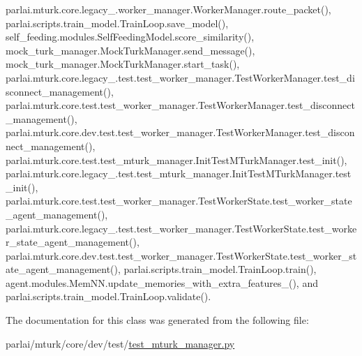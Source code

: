 parlai.\+mturk.\+core.\+legacy\+\_.\+worker\+\_\+manager.\+Worker\+Manager.\+route\+\_\+packet(), parlai.\+scripts.\+train\+\_\+model.\+Train\+Loop.\+save\+\_\+model(), self\+\_\+feeding.\+modules.\+Self\+Feeding\+Model.\+score\+\_\+similarity(), mock\+\_\+turk\+\_\+manager.\+Mock\+Turk\+Manager.\+send\+\_\+message(), mock\+\_\+turk\+\_\+manager.\+Mock\+Turk\+Manager.\+start\+\_\+task(), parlai.\+mturk.\+core.\+legacy\+\_.\+test.\+test\+\_\+worker\+\_\+manager.\+Test\+Worker\+Manager.\+test\+\_\+disconnect\+\_\+management(), parlai.\+mturk.\+core.\+test.\+test\+\_\+worker\+\_\+manager.\+Test\+Worker\+Manager.\+test\+\_\+disconnect\+\_\+management(), parlai.\+mturk.\+core.\+dev.\+test.\+test\+\_\+worker\+\_\+manager.\+Test\+Worker\+Manager.\+test\+\_\+disconnect\+\_\+management(), parlai.\+mturk.\+core.\+test.\+test\+\_\+mturk\+\_\+manager.\+Init\+Test\+M\+Turk\+Manager.\+test\+\_\+init(), parlai.\+mturk.\+core.\+legacy\+\_.\+test.\+test\+\_\+mturk\+\_\+manager.\+Init\+Test\+M\+Turk\+Manager.\+test\+\_\+init(), parlai.\+mturk.\+core.\+test.\+test\+\_\+worker\+\_\+manager.\+Test\+Worker\+State.\+test\+\_\+worker\+\_\+state\+\_\+agent\+\_\+management(), parlai.\+mturk.\+core.\+legacy\+\_.\+test.\+test\+\_\+worker\+\_\+manager.\+Test\+Worker\+State.\+test\+\_\+worker\+\_\+state\+\_\+agent\+\_\+management(), parlai.\+mturk.\+core.\+dev.\+test.\+test\+\_\+worker\+\_\+manager.\+Test\+Worker\+State.\+test\+\_\+worker\+\_\+state\+\_\+agent\+\_\+management(), parlai.\+scripts.\+train\+\_\+model.\+Train\+Loop.\+train(), agent.\+modules.\+Mem\+N\+N.\+update\+\_\+memories\+\_\+with\+\_\+extra\+\_\+features\+\_\+(), and parlai.\+scripts.\+train\+\_\+model.\+Train\+Loop.\+validate().



The documentation for this class was generated from the following file\+:\begin{DoxyCompactItemize}
\item 
parlai/mturk/core/dev/test/\hyperlink{dev_2test_2test__mturk__manager_8py}{test\+\_\+mturk\+\_\+manager.\+py}\end{DoxyCompactItemize}
